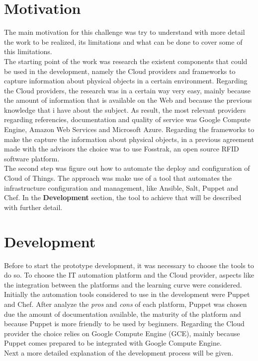 \documentclass[12pt, twocolumn]{article}
\begin{document}
 \section{Motivation}
 The main motivation for this challenge was try to understand with more detail the work to be realized, its limitations and what can be done to cover some of this limitations.\\
 The starting point of the work was research the existent components that could be used in the development, namely the Cloud providers and frameworks to capture information about physical objects in a certain environment.
 Regarding the Cloud providers, the research was in a certain way very easy, mainly because the amount of information that is available on the Web and because the previous knowledge that i have about the subject. As result, 
 the most relevant providers regarding referencies, documentation and quality of service was Google Compute Engine, Amazon Web Services and Microsoft Azure. Regarding the frameworks to make the capture the information about
 physical objects, in a previous agreement made with the advisors the choice was to use Fosstrak, an open source RFID software platform.\\
 The second step was figure out how to automate the deploy and configuration of Cloud of Things. The approach was make use of a tool that automates the infrastructure configuration and management, like Ansible, Salt, Puppet and Chef. 
 In the \textbf{Development} section, the tool to achieve that will be described with further detail.
 \section{Development}
 Before to start the prototype development, it was necessary to choose the tools to do so. To choose the IT automation platform and the Cloud provider, aspects like the integration between the platforms and the learning curve were considered.
 Initially the automation tools considered to use in the development were Puppet and Chef. After analyze the \textit{pros} and \textit{cons} of each platform, Puppet was chosen due the amount of documentation available, the maturity of the platform 
 and because Puppet is more friendly to be used by beginners. Regarding the Cloud provider the choice relies on Google Compute Engine (GCE), mainly because Puppet comes prepared to be integrated with Google Compute Engine.\\
 Next a more detailed explanation of the development process will be given. 
\end{document}
